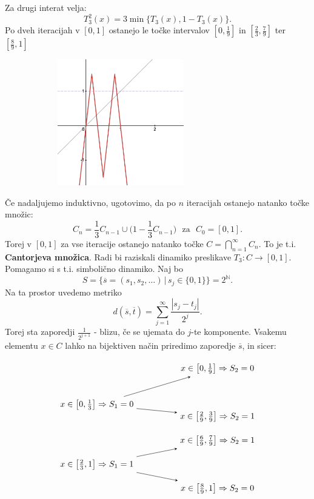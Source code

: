 \documentclass{article}
\newcommand{\N}{\mathbb{N}}
\begin{document}
Za drugi interat velja:
$$
T^2_3(x) = 3\min\{T_3(x), 1 - T_3(x)\}.
$$
Po dveh iteracijah v $[0, 1]$ ostanejo le točke intervalov $[0, \frac{1}{9}]$
in $[\frac{2}{3}, \frac{7}{9}]$ ter $[\frac{8}{9}, 1]$
\begin{figure}[h!]
    \begin{center}
        \includegraphics[width=8cm, height=5.5cm]{Grafi/cobweb19.png}
    \end{center}
\end{figure}

Če nadaljujemo induktivno, ugotovimo, da po $n$ iteracijah ostanejo 
natanko točke množic:
$$
C_n = \frac{1}{3} C_{n-1} \cup \Big(1 - \frac{1}{3} C_{n-1}\Big)\,\, \text{ za } \,\, C_0 = [0, 1].
$$
Torej v $[0, 1]$ za vse iteracije ostanejo natanko točke $C = \bigcap_{n=1}^\infty C_n$.
To je t.i. \textbf{Cantorjeva množica}. 
\noindent
Radi bi raziskali dinamiko preslikave $T_3: C \rightarrow [0, 1]$. 
Pomagamo si s t.i. simbolično dinamiko. Naj bo 
$$
S = \{ \overline{s} = (s_1, s_2, \dots) \,|\, s_j \in \{0, 1\}\} = 2^\N.
$$
Na ta prostor uvedemo metriko 
$$
d(\overline{s}, \overline{t}) = \sum_{j=1}^\infty \frac{|s_j - t_j|}{2^j}.
$$
Torej sta zaporedji $\frac{1}{2^{j+1}}$ - blizu, če se ujemata do $j$-te 
komponente. Vsakemu elementu $x\in C$ lahko na bijektiven način priredimo 
zaporedje $\overline{s}$, in sicer:

\[
\begin{tikzpicture}[>=stealth, node distance=2cm]
\node (A) at (0,0) {$x \in \left[0, \tfrac{1}{3}\right] \Rightarrow S_1 = 0$};
\node (B1) at (5,1.5) {$x \in \left[0, \tfrac{1}{9}\right] \Rightarrow S_2 = 0$};
\node (B2) at (5,-0.5) {$x \in \left[\tfrac{2}{9}, \tfrac{3}{9}\right] \Rightarrow S_2 = 1$};

\node (C) at (0,-2.5) {$x \in \left[\tfrac{2}{3}, 1\right] \Rightarrow S_1 = 1$};
\node (D1) at (5,-1.5) {$x \in \left[\tfrac{6}{9}, \tfrac{7}{9}\right] \Rightarrow S_2 = 1$};
\node (D2) at (5,-3.5) {$x \in \left[\tfrac{8}{9}, 1\right] \Rightarrow S_2 = 0$};

\draw[->] (A) -- (B1);
\draw[->] (A) -- (B2);

\draw[->] (C) -- (D1);
\draw[->] (C) -- (D2);
\end{tikzpicture}
\]
\end{document}
